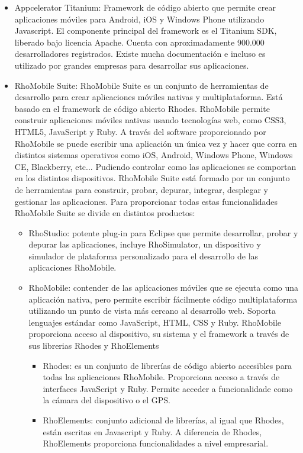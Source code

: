 \documentclass[
10pt, %
a4paper, %
oneside, %
headinclude,footinclude, %
BCOR5mm, %
]{scrartcl}
\begin{document}
\begin{itemize}
	\item Appcelerator Titanium: Framework de código abierto que permite crear aplicaciones móviles para Android, iOS y Windows Phone utilizando Javascript. El componente principal del framework es el Titanium SDK, liberado bajo licencia Apache. Cuenta con aproximadamente 900.000 desarrolladores registrados. Existe mucha documentación e incluso es utilizado por grandes empresas para desarrollar sus aplicaciones.

	\item RhoMobile Suite: RhoMobile Suite es un conjunto de herramientas de desarrollo para crear aplicaciones móviles nativas y multiplataforma. Está basado en el framework de código abierto Rhodes. RhoMobile permite construir aplicaciones móviles nativas usando tecnologías web, como CSS3, HTML5, JavaScript y Ruby. A través del software proporcionado por RhoMobile se puede escribir una aplicación un única vez y hacer que corra en distintos sistemas operativos como iOS, Android, Windows Phone, Windows CE, Blackberry, etc... Pudiendo controlar como las aplicaciones se comportan en los distintos dispositivos. RhoMobile Suite está formado por un conjunto de herramientas para construir, probar, depurar, integrar, desplegar y gestionar las aplicaciones. Para proporcionar todas estas funcionalidades RhoMobile Suite se divide en distintos productos:
	\begin{itemize}
		\item RhoStudio:  potente plug-in para Eclipse que permite desarrollar, probar y depurar las aplicaciones, incluye RhoSimulator, un dispositivo y simulador de plataforma personalizado para el desarrollo de las aplicaciones RhoMobile.

		\item RhoMobile: contender de las aplicaciones móviles que se ejecuta como una aplicación nativa, pero permite escribir fácilmente código multiplataforma utilizando un punto de vista más cercano al desarrollo web. Soporta lenguajes estándar como JavaScript, HTML, CSS y Ruby. RhoMobile proporciona acceso al dispositivo, su sistema y el framework a través de sus librerias Rhodes y RhoElements
		\begin{itemize}
			\item Rhodes: es un conjunto de librerías de código abierto accesibles para todas las aplicaciones RhoMobile. Proporciona acceso a través de interfaces JavaScript y Ruby. Permite acceder a funcionalidade como la cámara del dispositivo o el GPS.
			\item RhoElements: conjunto adicional de librerías, al igual que Rhodes, están escritas en Javascript y Ruby. A diferencia de Rhodes, RhoElements proporciona funcionalidades a nivel empresarial.
		\end{itemize}


\end{itemize}
\end{itemize}
\end{document}
